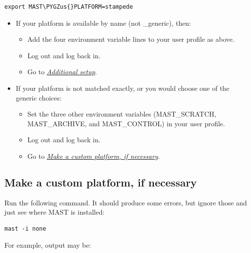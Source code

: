 \documentclass[letterpaper,10pt,english]{sphinxmanual}
\def\PYGZus{\char`\_}
\begin{document}
\begin{Verbatim}[commandchars=\\\{\}]
export MAST\PYGZus{}PLATFORM=stampede
\end{Verbatim}
\begin{itemize}
\item {} 
If your platform is available by name (not \_generic), then:
\begin{itemize}
\item {} 
Add the four environment variable lines to your user profile as above.

\item {} 
Log out and log back in.

\item {} 
Go to {\hyperref[1_0_installation:additional-setup]{\emph{Additional setup}}}.

\end{itemize}

\item {} 
If your platform is not matched exactly, or you would choose one of the generic choices:
\begin{itemize}
\item {} 
Set the three other environment variables (MAST\_SCRATCH, MAST\_ARCHIVE, and MAST\_CONTROL) in your user profile.

\item {} 
Log out and log back in.

\item {} 
Go to {\hyperref[1_0_installation:make-custom-platform]{\emph{Make a custom platform, if necessary}}}.

\end{itemize}

\end{itemize}


\subsection{Make a custom platform, if necessary}
\label{1_0_installation:make-a-custom-platform-if-necessary}\label{1_0_installation:make-custom-platform}
Run the following command. It should produce some errors, but ignore those and just see where MAST is installed:

\begin{Verbatim}[commandchars=\\\{\}]
mast -i none
\end{Verbatim}

For example, output may be:
\end{document}
